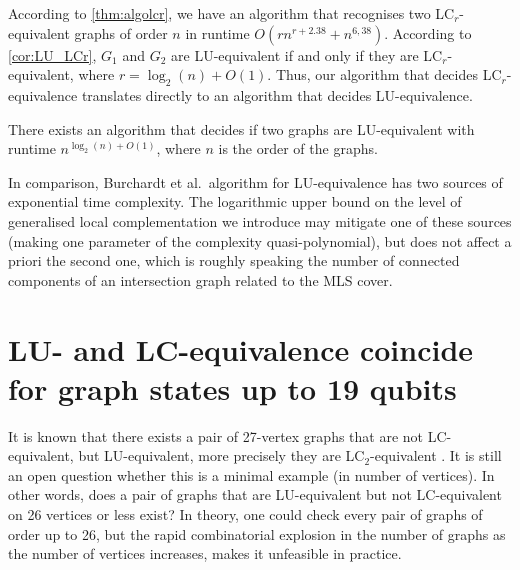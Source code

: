 \documentclass[a4paper,UKenglish,cleveref,autoref,thm-restate]{arxiv}
\begin{document}
According to \cref{thm:algolcr}, we have an algorithm that recognises two LC$_r$-equivalent graphs of order $n$ in runtime $O(r n^{r+2.38} + n^{6,38})$. According to \cref{cor:LU_LCr}, $G_1$ and $G_2$ are LU-equivalent if and only if they are LC$_r$-equivalent, where $r=\log_2(n)+O(1)$. Thus, our algorithm that decides LC$_r$-equivalence translates directly to an algorithm that decides LU-equivalence.

\begin{theorem}
    There exists an algorithm that decides if two graphs are LU-equivalent with runtime $n^{\log_2(n)+O(1)}$, where $n$ is the order of the graphs.
\end{theorem}

In comparison, Burchardt et al.~algorithm for LU-equivalence \cite{burchardt2024algorithmverifylocalequivalence} has two sources of exponential time complexity. The logarithmic upper bound on the level of generalised local complementation we introduce may mitigate one of these sources (making one parameter of the complexity quasi-polynomial), but does not affect a priori the second one, which is roughly speaking the number of connected components of an intersection graph related to the MLS cover. 

\section{LU- and LC-equivalence coincide for graph states up to 19 qubits} \label{sec:19qubits}

It is known that there exists a pair of 27-vertex graphs that are not LC-equivalent, but  LU-equivalent, more precisely they are LC$_2$-equivalent \cite{Ji07,Tsimakuridze17}. It is still  an open question whether this is a minimal example (in number of vertices). In other words, does a pair of graphs that are LU-equivalent but not LC-equivalent on 26 vertices or less exist? In theory, one could check every pair of graphs of order up to 26, but the rapid combinatorial explosion in the number of graphs as the number of vertices increases, makes it unfeasible in practice.
\end{document}
